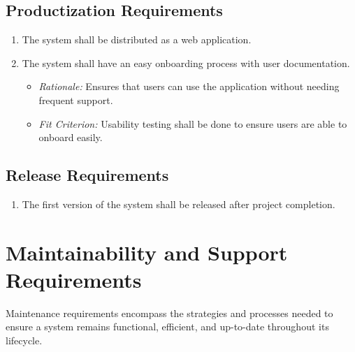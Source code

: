 \documentclass[12pt]{article}
\begin{document}
\subsection{Productization Requirements}
\begin{enumerate}
  \item The system shall be distributed as a web application.
  \item The system shall have an easy onboarding process with user
  documentation.
  \begin{itemize}
    \item \textit{Rationale:} Ensures that users can use the application without
    needing frequent support.
    \item \textit{Fit Criterion:} Usability testing shall be done to ensure
    users are able to onboard easily.
  \end{itemize}
\end{enumerate}

\subsection{Release Requirements}
\begin{enumerate}
  \item The first version of the system shall be released after project
  completion.
\end{enumerate}

\section{Maintainability and Support Requirements}
Maintenance requirements encompass the strategies and processes needed to ensure
a system remains functional, efficient, and up-to-date throughout its lifecycle.
\end{document}
